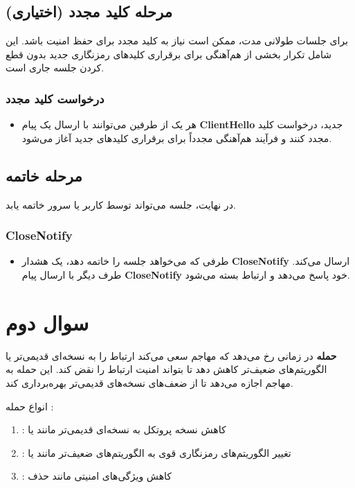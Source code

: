 \documentclass{report}
\begin{document}
\subsection*{مرحله کلید مجدد (اختیاری)}
برای جلسات طولانی مدت، ممکن است نیاز به کلید مجدد برای حفظ امنیت باشد. این شامل تکرار بخشی از هم‌آهنگی برای برقراری کلیدهای رمزنگاری جدید بدون قطع کردن جلسه جاری است.
	
\subsubsection*{درخواست کلید مجدد}
\begin{itemize}
	\item
	 هر یک از طرفین می‌توانند با ارسال یک پیام \textbf{ClientHello} جدید، درخواست کلید مجدد کنند و فرآیند هم‌آهنگی مجدداً برای برقراری کلیدهای جدید آغاز می‌شود.
\end{itemize}

\subsection*{مرحله خاتمه}	در نهایت، جلسه می‌تواند توسط کاربر یا سرور خاتمه یابد.
	
\subsubsection*{CloseNotify}
\begin{itemize}
	\item
	 طرفی که می‌خواهد جلسه را خاتمه دهد، یک هشدار \textbf{CloseNotify} ارسال می‌کند. طرف دیگر با ارسال پیام \textbf{CloseNotify} خود پاسخ می‌دهد و ارتباط بسته می‌شود.
\end{itemize}

\section{سوال دوم}

\textbf{حمله }
در  زمانی رخ می‌دهد که مهاجم سعی می‌کند ارتباط را به نسخه‌ای قدیمی‌تر یا الگوریتم‌های ضعیف‌تر  کاهش دهد تا بتواند امنیت ارتباط را نقض کند. این حمله به مهاجم اجازه می‌دهد تا از ضعف‌های نسخه‌های قدیمی‌تر  بهره‌برداری کند.

انواع حمله :
\begin{enumerate}
	\item \textbf{}:
	 کاهش نسخه پروتکل  به نسخه‌ای قدیمی‌تر مانند  یا 
	\item \textbf{}:
	 تغییر الگوریتم‌های رمزنگاری قوی به الگوریتم‌های ضعیف‌تر مانند  یا 
	\item \textbf{}:
	 کاهش ویژگی‌های امنیتی مانند حذف 
\end{enumerate}
\end{document}
